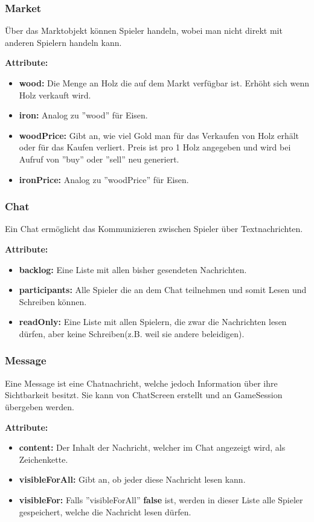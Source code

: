 \documentclass[fontsize=12pt,paper=a4,twoside]{scrartcl}
\begin{document}
\subsubsection{Market}

Über das Marktobjekt können Spieler handeln, wobei man nicht direkt mit anderen Spielern handeln kann.

\textbf{Attribute:}
\begin{itemize}
\item \textbf{wood:} Die Menge an Holz die auf dem Markt verfügbar ist. Erhöht sich wenn Holz verkauft wird.
\item \textbf{iron:} Analog zu ''wood'' für Eisen.
\item \textbf{woodPrice:} Gibt an, wie viel Gold man für das Verkaufen von Holz erhält oder für das Kaufen verliert. Preis ist pro 1 Holz angegeben und wird bei Aufruf von ''buy'' oder ''sell'' neu generiert.
\item \textbf{ironPrice:} Analog zu ''woodPrice'' für Eisen.
\end{itemize}

\subsubsection{Chat}

Ein Chat ermöglicht das Kommunizieren zwischen Spieler über Textnachrichten.

\textbf{Attribute:}
\begin{itemize}
\item \textbf{backlog:} Eine Liste mit allen bisher gesendeten Nachrichten.
\item \textbf{participants:} Alle Spieler die an dem Chat teilnehmen und somit Lesen und Schreiben können.
\item \textbf{readOnly:} Eine Liste mit allen Spielern, die zwar die Nachrichten lesen dürfen, aber keine Schreiben(z.B. weil sie andere beleidigen).
\end{itemize}

\subsubsection{Message}

Eine Message ist eine Chatnachricht, welche jedoch Information über ihre Sichtbarkeit besitzt. Sie kann von ChatScreen erstellt und an GameSession übergeben werden.

\textbf{Attribute:}
\begin{itemize}
\item \textbf{content:} Der Inhalt der Nachricht, welcher im Chat angezeigt wird, als Zeichenkette.
\item \textbf{visibleForAll:} Gibt an, ob jeder diese Nachricht lesen kann. 
\item \textbf{visibleFor:} Falls ''visibleForAll'' \textbf{false} ist, werden in dieser Liste alle Spieler gespeichert, welche die Nachricht lesen dürfen.
\end{itemize}
\end{document}
